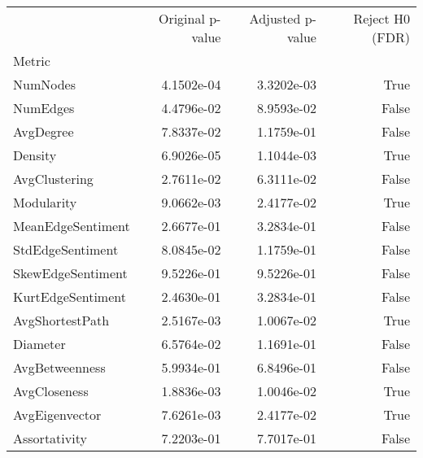 \begin{tabular}{lrrr}
\toprule
 & Original p-value & Adjusted p-value & Reject H0 (FDR) \\
Metric &  &  &  \\
\midrule
NumNodes & 4.1502e-04 & 3.3202e-03 & True \\
NumEdges & 4.4796e-02 & 8.9593e-02 & False \\
AvgDegree & 7.8337e-02 & 1.1759e-01 & False \\
Density & 6.9026e-05 & 1.1044e-03 & True \\
AvgClustering & 2.7611e-02 & 6.3111e-02 & False \\
Modularity & 9.0662e-03 & 2.4177e-02 & True \\
MeanEdgeSentiment & 2.6677e-01 & 3.2834e-01 & False \\
StdEdgeSentiment & 8.0845e-02 & 1.1759e-01 & False \\
SkewEdgeSentiment & 9.5226e-01 & 9.5226e-01 & False \\
KurtEdgeSentiment & 2.4630e-01 & 3.2834e-01 & False \\
AvgShortestPath & 2.5167e-03 & 1.0067e-02 & True \\
Diameter & 6.5764e-02 & 1.1691e-01 & False \\
AvgBetweenness & 5.9934e-01 & 6.8496e-01 & False \\
AvgCloseness & 1.8836e-03 & 1.0046e-02 & True \\
AvgEigenvector & 7.6261e-03 & 2.4177e-02 & True \\
Assortativity & 7.2203e-01 & 7.7017e-01 & False \\
\bottomrule
\end{tabular}

